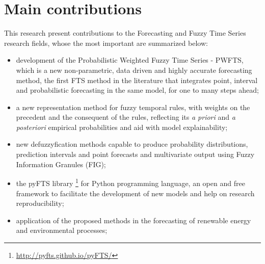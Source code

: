 \section{Main contributions} 

This research present contributions to the Forecasting and Fuzzy Time Series research fields, whose the most important are summarized below:

\begin{itemize}
    \item development of the Probabilistic Weighted Fuzzy Time Series - PWFTS, which is a new non-parametric, data driven and highly accurate forecasting method, the first FTS method in the literature that integrates point, interval and probabilistic forecasting in the same model, for one to many steps ahead;
    \item a new representation method for fuzzy temporal rules, with weights on the precedent and the consequent of the rules, reflecting its \textit{a priori} and \textit{a posteriori} empirical probabilities and aid with model explainability;
    \item new defuzzyfication methods capable to produce probability distributions, prediction intervals and point forecasts and multivariate output using Fuzzy Information Granules (FIG);
    \item the pyFTS library \cite{pyFTS}\footnote{\url{http://pyfts.github.io/pyFTS/}} for Python programming language, an open and free framework to facilitate the development of new models and help on research reproducibility;  
    \item application of the proposed methods in the forecasting of renewable energy and environmental processes;
\end{itemize}


